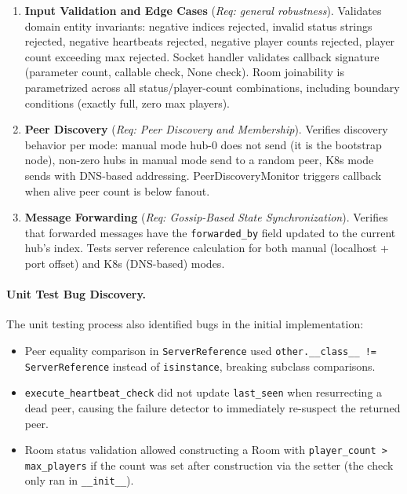 \begin{enumerate}
    \item \textbf{Input Validation and Edge Cases} (\textit{Req: general robustness}).
          Validates domain entity invariants: negative indices rejected, invalid status strings rejected, negative heartbeats rejected, negative player counts rejected, player count exceeding max rejected.
          Socket handler validates callback signature (parameter count, callable check, None check).
          Room joinability is parametrized across all status/player-count combinations, including boundary conditions (exactly full, zero max players).

    \item \textbf{Peer Discovery} (\textit{Req: Peer Discovery and Membership}).
          Verifies discovery behavior per mode: manual mode hub-0 does not send (it is the bootstrap node), non-zero hubs in manual mode send to a random peer, K8s mode sends with DNS-based addressing.
          PeerDiscoveryMonitor triggers callback when alive peer count is below fanout.

    \item \textbf{Message Forwarding} (\textit{Req: Gossip-Based State Synchronization}).
          Verifies that forwarded messages have the \texttt{forwarded\_by} field updated to the current hub's index.
          Tests server reference calculation for both manual (localhost + port offset) and K8s (DNS-based) modes.
\end{enumerate}

\paragraph{Unit Test Bug Discovery.}
The unit testing process also identified bugs in the initial implementation:
\begin{itemize}
    \item Peer equality comparison in \texttt{ServerReference} used \texttt{other.\_\_class\_\_ != ServerReference} instead of \texttt{isinstance}, breaking subclass comparisons.
    \item \texttt{execute\_heartbeat\_check} did not update \texttt{last\_seen} when resurrecting a dead peer, causing the failure detector to immediately re-suspect the returned peer.
    \item Room status validation allowed constructing a Room with \texttt{player\_count > max\_players} if the count was set after construction via the setter (the check only ran in \texttt{\_\_init\_\_}).
\end{itemize}

